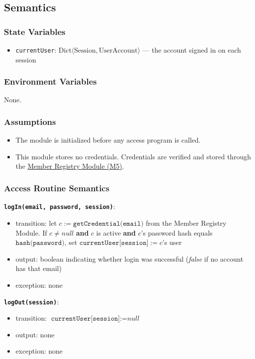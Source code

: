 \documentclass[12pt, titlepage]{article}
\begin{document}
\subsection{Semantics}

\subsubsection{State Variables}
\begin{itemize}
  \item \texttt{currentUser}: $\text{Dict}\langle \text{Session}, \text{UserAccount} \rangle$ --- the account signed in on each session
\end{itemize}

\subsubsection{Environment Variables}
None.

\subsubsection{Assumptions}
\begin{itemize}
  \item The module is initialized before any access program is called.
  \item This module stores no credentials. Credentials are verified and stored through the \hyperref[mMembers]{Member Registry Module (M5)}.
\end{itemize}

\subsubsection{Access Routine Semantics}

\textbf{\texttt{logIn(email, password, session)}}:
\begin{itemize}
  \item transition: let $c := \texttt{getCredential(email)}$ from the Member Registry Module. If $c \ne \textit{null}$ \textbf{and} $c$ is active \textbf{and} $c$'s password hash equals $\texttt{hash(password)}$, set $\texttt{currentUser[session]} := c$'s user
  \item output: boolean indicating whether login was successful (\textit{false} if no account has that email)
  \item exception: none
\end{itemize}

\textbf{\texttt{logOut(session)}}:
\begin{itemize}
  \item transition: $\texttt{currentUser[session]} := \textit{null}$
  \item output: none
  \item exception: none
\end{itemize}
\end{document}
